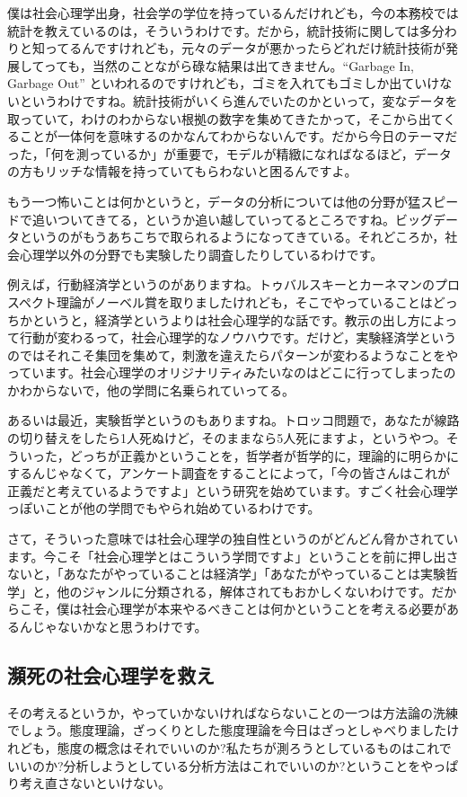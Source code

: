 \documentclass{ltjsbook}
\begin{document}
僕は社会心理学出身，社会学の学位を持っているんだけれども，今の本務校では統計を教えているのは，そういうわけです。だから，統計技術に関しては多分わりと知ってるんですけれども，元々のデータが悪かったらどれだけ統計技術が発展してっても，当然のことながら碌な結果は出てきません。``Garbage In, Garbage Out'' といわれるのですけれども，ゴミを入れてもゴミしか出ていけないというわけですね。統計技術がいくら進んでいたのかといって，変なデータを取っていて，わけのわからない根拠の数字を集めてきたかって，そこから出てくることが一体何を意味するのかなんてわからないんです。だから今日のテーマだった，「何を測っているか」が重要で，モデルが精緻になればなるほど，データの方もリッチな情報を持っていてもらわないと困るんですよ。

もう一つ怖いことは何かというと，データの分析については他の分野が猛スピードで追いついてきてる，というか追い越していってるところですね。ビッグデータというのがもうあちこちで取られるようになってきている。それどころか，社会心理学以外の分野でも実験したり調査したりしているわけです。

例えば，行動経済学というのがありますね。トゥバルスキーとカーネマンのプロスペクト理論がノーベル賞を取りましたけれども，そこでやっていることはどっちかというと，経済学というよりは社会心理学的な話です。教示の出し方によって行動が変わるって，社会心理学的なノウハウです。だけど，実験経済学というのではそれこそ集団を集めて，刺激を違えたらパターンが変わるようなことをやっています。社会心理学のオリジナリティみたいなのはどこに行ってしまったのかわからないで，他の学問に名乗られていってる。

あるいは最近，実験哲学というのもありますね。トロッコ問題で，あなたが線路の切り替えをしたら1人死ぬけど，そのままなら5人死にますよ，というやつ。そういった，どっちが正義かということを，哲学者が哲学的に，理論的に明らかにするんじゃなくて，アンケート調査をすることによって，「今の皆さんはこれが正義だと考えているようですよ」という研究を始めています。すごく社会心理学っぽいことが他の学問でもやられ始めているわけです。

さて，そういった意味では社会心理学の独自性というのがどんどん脅かされています。今こそ「社会心理学とはこういう学問ですよ」ということを前に押し出さないと，「あなたがやっていることは経済学」「あなたがやっていることは実験哲学」と，他のジャンルに分類される，解体されてもおかしくないわけです。だからこそ，僕は社会心理学が本来やるべきことは何かということを考える必要があるんじゃないかなと思うわけです。

\subsection{瀕死の社会心理学を救え}
その考えるというか，やっていかないければならないことの一つは方法論の洗練でしょう。態度理論，ざっくりとした態度理論を今日はざっとしゃべりましたけれども，態度の概念はそれでいいのか?私たちが測ろうとしているものはこれでいいのか?分析しようとしている分析方法はこれでいいのか?ということをやっぱり考え直さないといけない。
\end{document}
